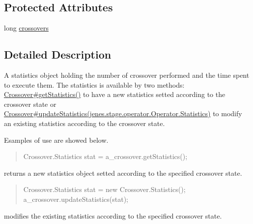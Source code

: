\subsection*{Protected Attributes}
\begin{DoxyCompactItemize}
\item 
long \hyperlink{classjenes_1_1stage_1_1operator_1_1_crossover_3_01_t_01extends_01_chromosome_01_4_1_1_statistics_abf1983cc628b3283b942dc68cc871bbc}{crossovers}
\end{DoxyCompactItemize}


\subsection{Detailed Description}
A statistics object holding the number of crossover performed and the time spent to execute them. The statistics is available by two methods\-: \hyperlink{}{Crossover\#get\-Statistics()} to have a new statistics setted according to the crossover state or \hyperlink{}{Crossover\#update\-Statistics(jenes.\-stage.\-operator.\-Operator.\-Statistics)} to modify an existing statistics according to the crossover state. 

Esamples of use are showed below. 

\begin{quotation}

\begin{DoxyPre}
Crossover.Statistics stat = a\_crossover.getStatistics();
\end{DoxyPre}
\end{quotation}


returns a new statistics object setted according to the specified crossover state. 

\begin{quotation}

\begin{DoxyPre}
Crossover.Statistics stat = new Crossover.Statistics();
a\_crossover.updateStatistics(stat);
\end{DoxyPre}
\end{quotation}


modifies the existing statistics according to the specified crossover state. 

